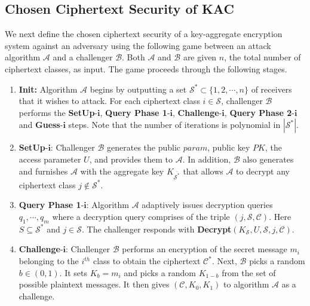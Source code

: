 \subsection{Chosen Ciphertext Security of KAC}
\label{subsec:ccasecurity}

We next define the chosen ciphertext security of a key-aggregate encryption system against an adversary using the following game between an attack algorithm $\mathcal{A}$ and a challenger $\mathcal{B}$. Both $\mathcal{A}$ and $\mathcal{B}$ are given $n$, the total number of ciphertext classes, as input. The game proceeds through the following stages.

\begin{enumerate}
 \item \textbf{Init:} Algorithm $\mathcal{A}$ begins by outputting a set ${\mathcal{S}}^{*} \subset \{1,2,\cdots,n\}$ of receivers that it wishes to attack. For each ciphertext class $i\in\mathcal{S}$, challenger $\mathcal{B}$ performs the \textbf{SetUp}-$\mathbf{i}$, \textbf{Query Phase 1}-$\mathbf{i}$, \textbf{Challenge}-$\mathbf{i}$, \textbf{Query Phase 2}-$\mathbf{i}$ and \textbf{Guess}-$\mathbf{i}$ steps. Note that the number of iterations is polynomial in $|{\mathcal{S}}^{*}|$.

 \item \textbf{SetUp}-$\mathbf{i}$: Challenger $\mathcal{B}$ generates the public $param$, public key $PK$, the access parameter $U$, and provides them to $\mathcal{A}$. In addition, $\mathcal{B}$ also generates and furnishes $\mathcal{A}$ with the aggregate key $K_{\overline{{\mathcal{S}}^{*}}}$ that allows $\mathcal{A}$ to decrypt any ciphertext class $j\notin{\mathcal{S}}^{*}$.
 
 \item \textbf{Query Phase 1}-$\mathbf{i}$: Algorithm $\mathcal{A}$ adaptively issues decryption queries $q_1,\cdots,q_m$ where a decryption query comprises of the triple $(j,\mathcal{S},\mathcal{C})$. Here $S\subseteq{\mathcal{S}}^{*}$ and $j\in\mathcal{S}$. The challenger responds with \textbf{Decrypt}$(K_{\mathcal{S}}, U, \mathcal{S},j,\mathcal{C})$. 
 
 \item \textbf{Challenge}-$\mathbf{i}$: Challenger $\mathcal{B}$ performs an encryption of the secret message $m_i$ belonging to the $i^{th}$ class to obtain the ciphertext ${\mathcal{C}}^{*}$. Next, $\mathcal{B}$ picks a random $b\in{(0,1)}$. It sets $K_b = m_i$ and picks a random $K_{1- b}$ from the set of possible plaintext messages. It then gives $(\mathcal{C}, K_0, K_1)$ to algorithm $\mathcal{A}$ as a challenge.
 

\end{enumerate}
